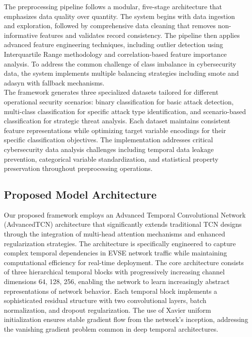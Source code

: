 The preprocessing pipeline follows a modular, five-stage architecture that emphasizes data quality over quantity. The system begins with data ingestion and exploration, followed by comprehensive data cleaning that removes non-informative features and validates record consistency. The pipeline then applies advanced feature engineering techniques, including outlier detection using Interquartile Range methodology and correlation-based feature importance analysis. To address the common challenge of class imbalance in cybersecurity data, the system implements multiple balancing strategies including \gls{smote} and \gls{adasyn} with fallback mechanisms. \\

The framework generates three specialized datasets tailored for different operational security scenarios: binary classification for basic attack detection, multi-class classification for specific attack type identification, and scenario-based classification for strategic threat analysis. Each dataset maintains consistent feature representations while optimizing target variable encodings for their specific classification objectives. The implementation addresses critical cybersecurity data analysis challenges including temporal data leakage prevention, categorical variable standardization, and statistical property preservation throughout preprocessing operations. %

\subsection{Proposed Model Architecture}
\label{subsection:proposed-model-architecture}
Our proposed framework employs an Advanced Temporal Convolutional Network (AdvancedTCN) architecture that significantly extends traditional TCN designs through the integration of multi-head attention mechanisms and enhanced regularization strategies. The architecture is specifically engineered to capture complex temporal dependencies in EVSE network traffic while maintaining computational efficiency for real-time deployment.
The core architecture consists of three hierarchical temporal blocks with progressively increasing channel dimensions {64, 128, 256}, enabling the network to learn increasingly abstract representations of network behavior. Each temporal block implements a sophisticated residual structure with two convolutional layers, batch normalization, and dropout regularization. The use of Xavier uniform initialization ensures stable gradient flow from the network's inception, addressing the vanishing gradient problem common in deep temporal architectures.

